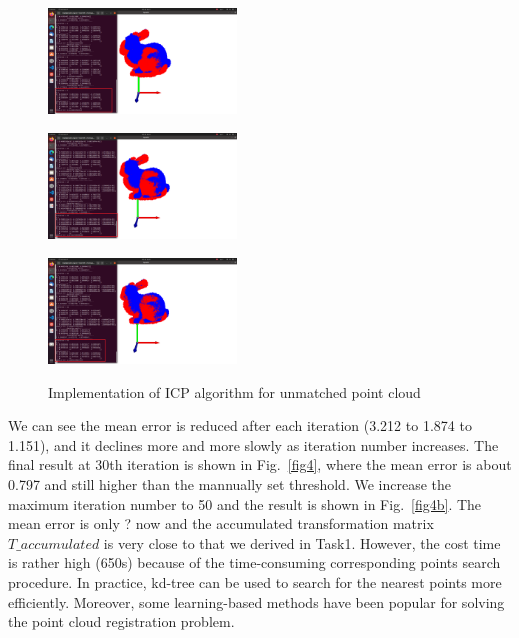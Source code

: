 \documentclass[hyperref]{article}
\theoremstyle{nonumberplain}
\begin{document}
\begin{figure}[H]
	\centering
	\begin{minipage}[t]{0.32\textwidth}
		\centering
		\includegraphics[width=5cm]{2_M1.png}
		\label{fig3a}
	\end{minipage}
	\begin{minipage}[t]{0.32\textwidth}
		\centering
		\includegraphics[width=5cm]{2_M2.png}
		\label{fig3b}
	\end{minipage}
	\begin{minipage}[t]{0.32\textwidth}
		\centering
		\includegraphics[width=5cm]{2_M3.png}
		\label{fig3c}
	\end{minipage}
	\caption{Implementation of ICP algorithm for unmatched point cloud}
	\label{fig3}
\end{figure} 

We can see the mean error is reduced after each iteration (3.212 to 1.874 to 1.151), and it declines more and more slowly as iteration number increases. The final result at 30th iteration is shown in Fig.~\ref{fig4}, where the mean error is about 0.797 and still higher than the mannually set threshold. We increase the maximum iteration number to 50 and the result is shown in Fig.~\ref{fig4b}. The mean error is only ? now and the accumulated transformation matrix $T\_accumulated$ is very close to that we derived in Task1. However, the cost time is rather high (650s) because of the time-consuming corresponding points search procedure. In practice, kd-tree can be used to search for the nearest points more efficiently. Moreover, some learning-based methods have been popular for solving the point cloud registration problem. 
\end{document}
